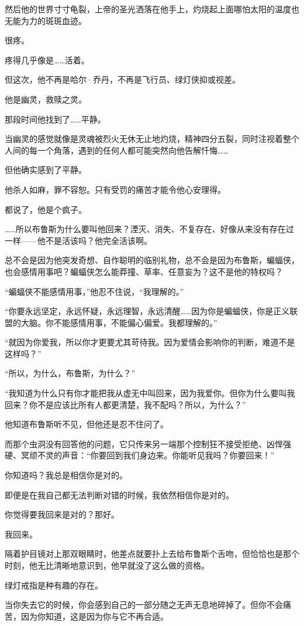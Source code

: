 \documentclass[../main]{subfiles}
\begin{document}
然后他的世界寸寸龟裂，上帝的圣光洒落在他手上，灼烧起上面哪怕太阳的温度也无能为力的斑斑血迹。

很疼。

疼得几乎像是……活着。

但这次，他不再是哈尔·乔丹，不再是飞行员、绿灯侠抑或视差。

他是幽灵，救赎之灵。

那段时间他找到了……平静。

当幽灵的感觉就像是灵魂被烈火无休无止地灼烧，精神四分五裂，同时注视着整个人间的每一个角落，遇到的任何人都可能突然向他告解忏悔……

但他确实感到了平静。

他杀人如麻，罪不容恕。只有受罚的痛苦才能令他心安理得。

都说了，他是个疯子。

……所以布鲁斯为什么要叫他回来？湮灭、消失、不复存在、好像从来没有存在过一样——他不是活该吗？他完全活该啊。

总不会是因为他突发奇想、自作聪明的临别礼物，总不会是因为布鲁斯，蝙蝠侠，也会感情用事吧？蝙蝠侠怎么能莽撞、草率、任意妄为？这不是他的特权吗？

“蝙蝠侠不能感情用事，”他忍不住说，“我理解的。”

“你要永远坚定，永远怀疑，永远理智，永远清醒……因为你是蝙蝠侠，你是正义联盟的大脑。你不能感情用事，不能偏心偏爱。我都理解的。”

“就因为你爱我，所以你才更要尤其苛待我。因为爱情会影响你的判断，难道不是这样吗？”

“所以，为什么，布鲁斯，为什么？”

“我知道为什么只有你才能把我从虚无中叫回来，因为我爱你。但你为什么要叫我回来？你不是应该比所有人都更清楚，我不配吗？所以，为什么？”

他知道布鲁斯听不见，但他还是忍不住问了。

而那个虫洞没有回答他的问题，它只传来另一端那个控制狂不接受拒绝、凶悍强硬、冥顽不灵的声音：“你要回到我们身边来。你能听见我吗？你要回来！”

你知道吗？我总是相信你是对的。

即便是在我自己都无法判断对错的时候，我依然相信你是对的。

你觉得要我回来是对的？那好。

我回来。

隔着护目镜对上那双眼睛时，他差点就要扑上去给布鲁斯个舌吻，但恰恰也是那个时刻，他无比清晰地意识到，他早就没了这么做的资格。

绿灯戒指是种有趣的存在。

当你失去它的时候，你会感到自己的一部分随之无声无息地碎掉了。但你不会痛苦，因为你知道，这是因为你与它不再合适。
\end{document}
